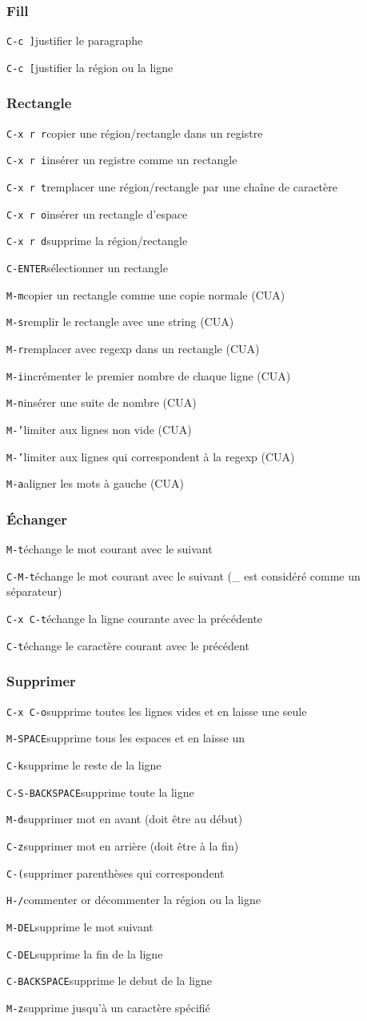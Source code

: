 \documentclass[10pt,landscape]{article}
\def\cm#1#2{{\tt#1}\dotfill#2\par}
\begin{document}
\begin{multicols}{3}
\subsubsection{Fill}
\cm{C-c ]}{justifier le paragraphe}
\cm{C-c [}{justifier la région ou la ligne}

\subsubsection{Rectangle}
\cm{C-x r r}{copier une région/rectangle dans un registre}
\cm{C-x r i}{insérer un registre comme un rectangle}
\cm{C-x r t}{remplacer une région/rectangle par une chaîne de caractère}
\cm{C-x r o}{insérer un rectangle d'espace}
\cm{C-x r d}{supprime la région/rectangle}
\cm{C-ENTER}{sélectionner un rectangle}
\cm{M-m}{copier un rectangle comme une copie normale (CUA)}
\cm{M-s}{remplir le rectangle avec une string (CUA)}
\cm{M-r}{remplacer avec regexp dans un rectangle (CUA)}
\cm{M-i}{incrémenter le premier nombre de chaque ligne (CUA)}
\cm{M-n}{insérer une suite de nombre (CUA)}
\cm{M-'}{limiter aux lignes non vide (CUA)}
\cm{M-'}{limiter aux lignes qui correspondent à la regexp (CUA)}
\cm{M-a}{aligner les mots à gauche (CUA)}

\subsubsection{Échanger}
\cm{M-t}{échange le mot courant avec le suivant}
\cm{C-M-t}{échange le mot courant avec le suivant (\_ est considéré comme un séparateur)}
\cm{C-x C-t}{échange la ligne courante avec la précédente}
\cm{C-t}{échange le caractère courant avec le précédent}

\subsubsection{Supprimer}
\cm{C-x C-o}{supprime toutes les lignes vides et en laisse une seule}
\cm{M-SPACE}{supprime tous les espaces et en laisse un}
\cm{C-k}{supprime le reste de la ligne}
\cm{C-S-BACKSPACE}{supprime toute la ligne}
\cm{M-d}{supprimer mot en avant (doit être au début)}
\cm{C-z}{supprimer mot en arrière (doit être à la fin)}
\cm{C-(}{supprimer parenthèses qui correspondent}
\cm{H-/}{commenter or décommenter la région ou la ligne}
\cm{M-DEL}{supprime le mot suivant}
\cm{C-DEL}{supprime la fin de la ligne}
\cm{C-BACKSPACE}{supprime le debut de la ligne}
\cm{M-z}{supprime jusqu'à un caractère spécifié}




\end{multicols}
\end{document}
